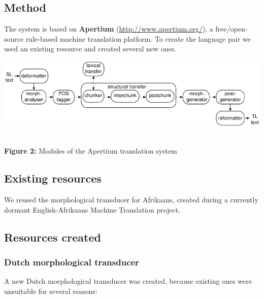 \documentclass[a0,landscape]{a0poster}
\begin{document}
\begin{multicols}{4}

\section{Method}

\noindent
The system is based on {\bf Apertium} (\url{http://www.apertium.org/}), a free/open-source rule-based
machine translation platform. To create the language pair we used an existing resource and created 
several new ones. \\

\begin{center}
\begin{minipage}[b]{26cm}
\includegraphics[width=260mm]{apertium2.pdf}
\end{minipage}\\
\textbf{Figure 2:} Modules of the Apertium translation system
\vspace{0.3cm}
\end{center}


\vspace{0.5cm}

\subsection{Existing resources}

\noindent
We reused the morphological transducer for Afrikaans, created during a currently dormant English-Afrikaans
Machine Translation project.\\

\subsection{Resources created}

\subsubsection{Dutch morphological transducer}
A new Dutch morphological transducer was created, because existing ones were unsuitable for several reasons:


\end{multicols}
\end{document}
